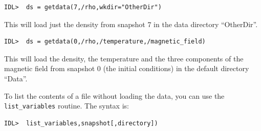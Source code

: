 \documentclass[11pt]{article}
\begin{document}
\begin{verbatim}
IDL>  ds = getdata(7,/rho,wkdir="OtherDir")
\end{verbatim}
This will load just the density from snapshot 7 in the data directory ``OtherDir''.

\begin{verbatim}
IDL>  ds = getdata(0,/rho,/temperature,/magnetic_field)
\end{verbatim}
This will load the density, the temperature and the three components of the magnetic field from snapshot 0 (the initial conditions) in the default directory ``Data''.

To list the contents of a file without loading the data, you can use the \texttt{list\_variables} routine. The syntax is:

\begin{verbatim}
IDL>  list_variables,snapshot[,directory])
\end{verbatim}
\end{document}
